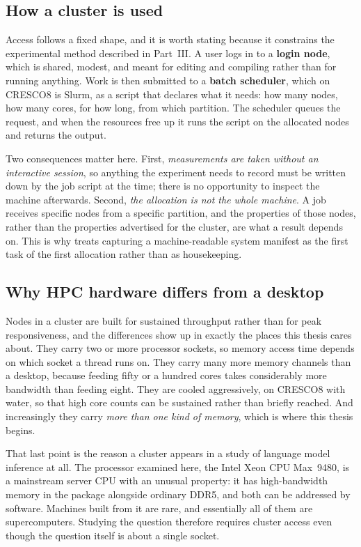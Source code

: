 \subsection{How a cluster is used}

Access follows a fixed shape, and it is worth stating because it
constrains the experimental method described in Part~III.  A user logs
in to a \textbf{login node}, which is shared, modest, and meant for
editing and compiling rather than for running anything.  Work is then
submitted to a \textbf{batch scheduler}, which on CRESCO8 is Slurm, as
a script that declares what it needs: how many nodes, how
many cores, for how long, from which partition.  The scheduler queues
the request, and when the resources free up it runs the script on the
allocated nodes and returns the output.

Two consequences matter here.  First, \emph{measurements are taken
without an interactive session}, so anything the experiment needs to
record must be written down by the job script at the time; there is no
opportunity to inspect the machine afterwards.  Second, \emph{the
allocation is not the whole machine}.  A job receives specific nodes
from a specific partition, and the properties of those nodes, rather than
the properties advertised for the cluster, are what a result depends
on.  This is why  treats capturing a
machine-readable system manifest as the first task of the first
allocation rather than as housekeeping.

\subsection{Why HPC hardware differs from a desktop}

Nodes in a cluster are built for sustained throughput rather than for
peak responsiveness, and the differences show up in exactly the places
this thesis cares about.  They carry two or more processor sockets, so
memory access time depends on which socket a thread runs on.  They
carry many more memory channels than a desktop, because feeding fifty
or a hundred cores takes considerably more bandwidth than feeding
eight.  They are cooled aggressively, on CRESCO8 with water, so that high core
counts can be sustained rather than briefly reached.  And
increasingly they carry \emph{more than one kind of memory}, which is
where this thesis begins.

That last point is the reason a cluster appears in a study of language
model inference at all.  The processor examined here, the Intel Xeon CPU
Max~9480, is a mainstream server CPU with an unusual property: it has
high-bandwidth memory in the package alongside ordinary DDR5, and both
can be addressed by software.  Machines built from it are rare, and
essentially all of them are supercomputers.  Studying the question
therefore requires cluster access even though the question itself is
about a single socket.

